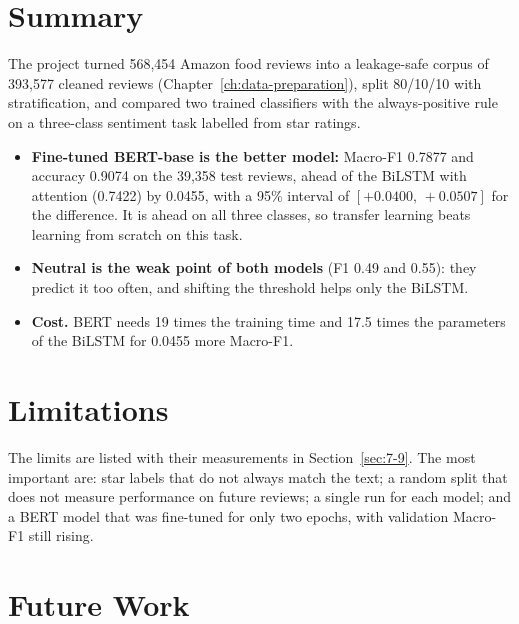 \section{Summary}
\label{sec:8-1}

The project turned 568{,}454 Amazon food reviews into a leakage-safe corpus of 393{,}577 cleaned reviews (Chapter~\ref{ch:data-preparation}), split 80/10/10 with stratification, and compared two trained classifiers with the always-positive rule on a three-class sentiment task labelled from star ratings.

\begin{itemize}
    \item \textbf{Fine-tuned BERT-base is the better model:} Macro-F1 0.7877 and accuracy 0.9074 on the 39{,}358 test reviews, ahead of the BiLSTM with attention (0.7422) by 0.0455, with a 95\% interval of $[+0.0400,\,+0.0507]$ for the difference. It is ahead on all three classes, so transfer learning beats learning from scratch on this task.
    \item \textbf{Neutral is the weak point of both models} (F1 0.49 and 0.55): they predict it too often, and shifting the threshold helps only the BiLSTM.
    \item \textbf{Cost.} BERT needs 19 times the training time and 17.5 times the parameters of the BiLSTM for 0.0455 more Macro-F1.
\end{itemize}

\section{Limitations}
\label{sec:8-2}

The limits are listed with their measurements in Section~\ref{sec:7-9}. The most important are: star labels that do not always match the text; a random split that does not measure performance on future reviews; a single run for each model; and a BERT model that was fine-tuned for only two epochs, with validation Macro-F1 still rising.

\section{Future Work}
\label{sec:8-3}

